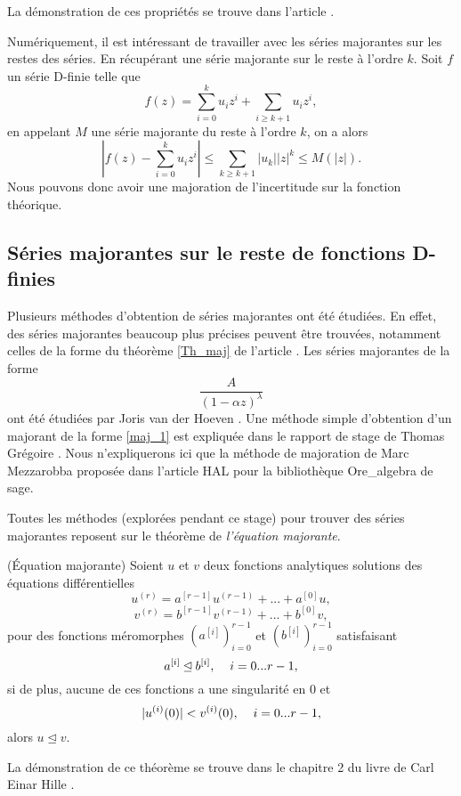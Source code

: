 \documentclass[a4paper,10pt]{article}
\begin{document}
	\noindent La démonstration de ces propriétés se trouve dans l'article \cite{hille1997ordinary}.
	
	\vspace{4mm}
	
	
	Numériquement, il est intéressant de travailler avec les séries majorantes sur les restes des séries. En récupérant une série majorante sur le reste à l'ordre $k$. Soit $f$ un série D-finie telle que 
	\[f(z)=\sum_{i=0}^{k}u_iz^i+\sum_{i \geq k+1}u_iz^i,\]
	en appelant $M$ une série majorante du reste à l'ordre $k$, on a alors
	\[|f(z)-\sum_{i=0}^{k}u_iz^i| \leq \sum_{k\geq k+1}|u_k||z|^k \leq M(|z|).\]
	Nous pouvons donc avoir une majoration de l'incertitude sur la fonction théorique.
	
	\subsection{Séries majorantes sur le reste de fonctions D-finies}
	\label{subsec:séries maj}
	Plusieurs méthodes d'obtention de séries majorantes ont été étudiées. En effet, des séries majorantes beaucoup plus précises peuvent être trouvées, notamment celles de la forme du théorème \ref{Th_maj} de l'article \cite{MezzarobbaSalvy2010}. Les séries majorantes de la forme
	\begin{equation}
		\frac{A}{(1-\alpha z)^\lambda}
		\label{maj_1}
	\end{equation}
	ont été étudiées par Joris van der Hoeven  \cite{van2001fast}. Une méthode simple d'obtention d'un majorant de la forme \eqref{maj_1} est expliquée dans le rapport de stage de Thomas Grégoire \cite{gregoire2012certified}. Nous n'expliquerons ici que la méthode de majoration de Marc Mezzarobba proposée dans l'article HAL \cite{Mezzarobba2019} pour la bibliothèque Ore\_algebra de sage.
	
	\vspace{4mm}
	
	Toutes les méthodes (explorées pendant ce stage) pour trouver des séries majorantes reposent sur le théorème de \textit{l'équation majorante}.
	
	\begin{theorem}(Équation majorante)
		Soient $u$ et $v$ deux fonctions analytiques solutions des équations différentielles
		\[u^{(r)}=a^{[r-1]}u^{(r-1)}+...+a^{[0]}u,\]
		\[v^{(r)}=b^{[r-1]}v^{(r-1)}+...+b^{[0]}v,\]
		pour des fonctions méromorphes $(a^{[i]})_{i=0}^{r-1}$ et $(b^{[i]})_{i=0}^{r-1}$ satisfaisant 
		\[a^{[i]} \unlhd b^{[i]}, \hspace{4mm} i=0...r-1,\]
		si de plus, aucune de ces fonctions a une singularité en 0 et
		\[|u^{(i)}(0)|<v^{(i)}(0),\hspace{4mm} i=0...r-1,\] 
		alors $u\unlhd v$.
	\end{theorem}
	\noindent La démonstration de ce théorème se trouve dans le chapitre 2 du livre de Carl Einar Hille \cite{hille1997ordinary}.
	
\end{document}

